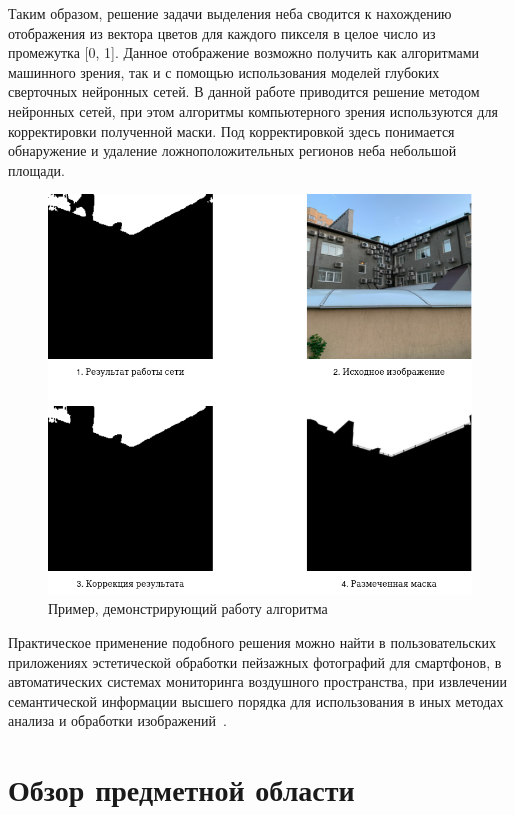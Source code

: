 Таким образом, решение задачи выделения неба сводится к нахождению отображения из вектора цветов для каждого пикселя в целое число из промежутка [0, 1].
Данное отображение возможно получить как алгоритмами машинного зрения, так и с помощью использования моделей глубоких сверточных нейронных сетей.
В данной работе приводится решение методом нейронных сетей, при этом алгоритмы компьютерного зрения используются для корректировки полученной маски.
Под корректировкой здесь понимается обнаружение и удаление ложноположительных регионов неба небольшой площади.

\begin{figure}[H]
    \centering
    \includegraphics[width=\textwidth]{img/sky_segmentation.png}
    \caption{Пример, демонстрирующий работу алгоритма}
    \label{fig:sky_seg}
\end{figure}

Практическое применение подобного решения можно найти в пользовательских приложениях эстетической обработки пейзажных фотографий для смартфонов,
в автоматических системах мониторинга воздушного пространства, при извлечении семантической информации высшего порядка для использования в иных методах анализа
и обработки изображений~\autocite{7415405}.

\section{Обзор предметной области}

